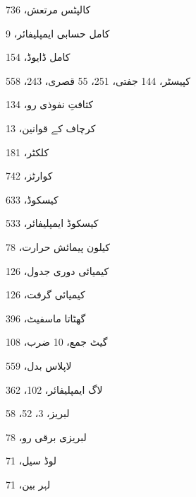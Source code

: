\begin{theindex}
\item کالپٹس مرتعش، 736
\item کامل حسابی ایمپلیفائر، 9
\item کامل ڈایوڈ، 154
\item کپیسٹر، 144 
     \subitem جفتی، 251، 55 
     \subitem قصری، 243، 558
\item کثافتِ نفوذی رو، 134
\item کرچاف کے قوانین، 13
\item کلکٹر، 181
\item کوارٹز، 742
\item کیسکوڈ، 633
\item کیسکوڈ ایمپلیفائر، 533
\item کیلون پیمائش حرارت، 78
\item کیمیائی دوری جدول، 126
\item کیمیائی گرفت، 126

\indexspace

\item گھٹاتا ماسفیٹ، 396
\item گیٹ 
     \subitem جمع، 10 
     \subitem ضرب، 108

\indexspace

\item لاپلاس بدل، 559
\item لاگ ایمپلیفائر، 102، 362
\item لبریز، 3، 52، 58
\item لبریزی برقی رو، 78
\item لوڈ سیل، 71
\item لہر بین، 71

\indexspace


\end{theindex}
